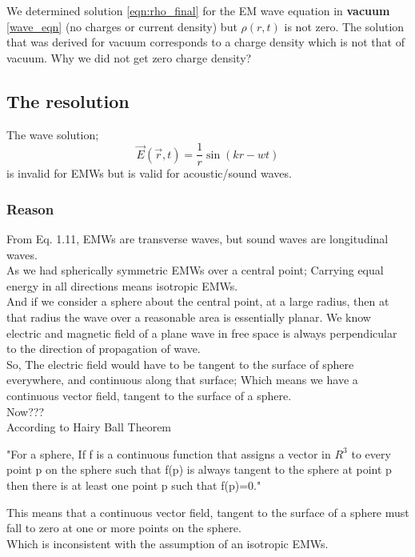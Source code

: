 We determined solution \eqref{eqn:rho_final} for the EM wave equation in \textbf{vacuum} \eqref{wave_eqn} (no charges or current density) but $\rho(r,t)$ is not zero. The solution that was derived for vacuum corresponds to a charge density which is not that of vacuum. Why we did not get zero charge density?

\subsection{The resolution}

The wave solution;\\
\begin{equation}
\vec{E}(\vec{r},t) = \frac{1}{r}\sin(kr-wt)
\end{equation}
is invalid for EMWs but is valid for acoustic/sound waves.\\

\subsubsection{Reason}
From Eq. 1.11, EMWs are transverse waves, but sound waves are longitudinal waves.\\
As we had spherically symmetric EMWs over a central point;
Carrying equal energy in all directions means isotropic EMWs.\\
And if we consider a sphere about the central point, at a large radius, then at that radius the wave over a reasonable area is essentially planar. We know electric and magnetic field of a plane wave in free space is always perpendicular to the direction of propagation of wave.\\
So, The electric field would have to be tangent to the surface of sphere everywhere, and continuous along that surface; Which means we have a continuous vector field, tangent to the surface of a sphere.\\
Now???\\
According to Hairy Ball Theorem
\begin{center}
	"For a sphere, If f is a continuous function that assigns a vector in $R^3$ to every point p on the sphere such that f(p) is always tangent to the sphere at point p then there is at least one point p such that f(p)=0."\\
\end{center}
This means that a continuous vector field, tangent to the surface of a sphere must fall to zero at one or more points on the sphere.\\
Which is inconsistent with the assumption of an isotropic EMWs.

